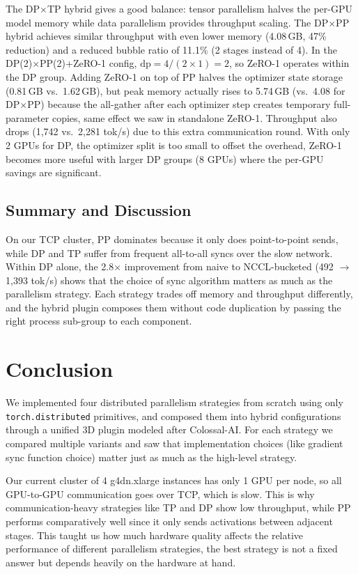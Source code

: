 \documentclass[conference]{IEEEtran}
\begin{document}
The DP$\times$TP hybrid gives a good balance: tensor parallelism halves the per-GPU model memory while data parallelism provides throughput scaling. The DP$\times$PP hybrid achieves similar throughput with even lower memory (4.08\,GB, 47\% reduction) and a reduced bubble ratio of 11.1\% (2 stages instead of 4). In the DP(2)$\times$PP(2)+ZeRO-1 config, $\text{dp} = 4/(2{\times}1) = 2$, so ZeRO-1 operates within the DP group. Adding ZeRO-1 on top of PP halves the optimizer state storage (0.81\,GB vs.\ 1.62\,GB), but peak memory actually rises to 5.74\,GB (vs.\ 4.08 for DP$\times$PP) because the all-gather after each optimizer step creates temporary full-parameter copies, same effect we saw in standalone ZeRO-1. Throughput also drops (1,742 vs.\ 2,281 tok/s) due to this extra communication round. With only 2 GPUs for DP, the optimizer split is too small to offset the overhead, ZeRO-1 becomes more useful with larger DP groups (8 GPUs) where the per-GPU savings are significant.

\subsection{Summary and Discussion}

On our TCP cluster, PP dominates because it only does point-to-point sends, while DP and TP suffer from frequent all-to-all syncs over the slow network. Within DP alone, the 2.8$\times$ improvement from naive to NCCL-bucketed (492 $\rightarrow$ 1,393 tok/s) shows that the choice of sync algorithm matters as much as the parallelism strategy. Each strategy trades off memory and throughput differently, and the hybrid plugin composes them without code duplication by passing the right process sub-group to each component.

\section{Conclusion}

We implemented four distributed parallelism strategies from scratch using only \texttt{torch.distributed} primitives, and composed them into hybrid configurations through a unified 3D plugin modeled after Colossal-AI. For each strategy we compared multiple variants and saw that implementation choices (like gradient sync function choice) matter just as much as the high-level strategy.

Our current cluster of 4 g4dn.xlarge instances has only 1 GPU per node, so all GPU-to-GPU communication goes over TCP, which is slow. This is why communication-heavy strategies like TP and DP show low throughput, while PP performs comparatively well since it only sends activations between adjacent stages. This taught us how much hardware quality affects the relative performance of different parallelism strategies, the best strategy is not a fixed answer but depends heavily on the hardware at hand.
\end{document}
